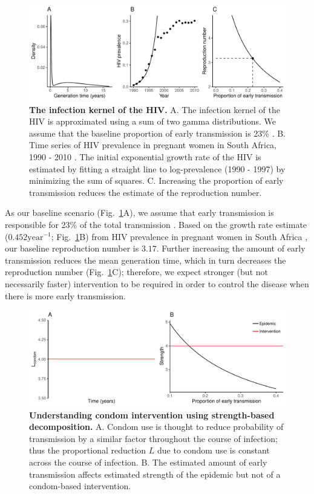 \documentclass[12pt]{article}\usepackage[]{graphicx}\usepackage[]{color}
\newcommand{\figref}[1]{Fig.~\ref{fig:#1}}
\newcommand{\figlab}[1]{\label{fig:#1}}
\begin{document}
\begin{figure}[!t]
\includegraphics[width=\textwidth]{../figure/HIV.pdf}
\caption{
\textbf{The infection kernel of the HIV.}
A. The infection kernel of the HIV is approximated using a sum of two gamma distributions. We assume that the baseline proportion of early transmission is 23\% \citep{hayes2006amplified}.
B. Time series of HIV prevalence in pregnant women in South Africa, 1990 - 2010 \citep{barron2013eliminating}. The initial exponential growth rate of the HIV is estimated by fitting a straight line to log-prevalence (1990 - 1997) by minimizing the sum of squares.
C. Increasing the proportion of early transmission reduces the estimate of the reproduction number.
}
\figlab{example}
\end{figure}

As our baseline scenario (\figref{example}A), we assume that early transmission is responsible for 23\% of the total transmission \citep{hayes2006amplified}.
Based on the growth rate estimate ($0.452 \textrm{year}^{-1}$; \figref{example}B) from HIV prevalence in pregnant women in South Africa \citep{barron2013eliminating}, our baseline reproduction number is $3.17$.
Further increasing the amount of early transmission reduces the mean generation time, which in turn decreases the reproduction number (\figref{example}C);
therefore, we expect stronger (but not necessarily faster) intervention to be required in order to control the disease when there is more early transmission.

\begin{figure}[!t]
\includegraphics[width=\textwidth]{../figure/condom.pdf}
\caption{
\textbf{Understanding condom intervention using strength-based decomposition.}
A. Condom use is thought to reduce probability of transmission by a similar factor throughout the course of infection; thus the proportional reduction $L$ due to condom use is constant across the course of infection. 
B. The estimated amount of early transmission affects estimated strength of the epidemic but not of a condom-based intervention.
}
\figlab{condom}
\end{figure}
\end{document}
